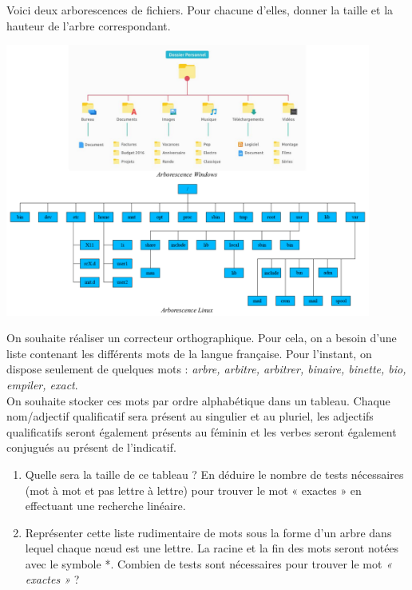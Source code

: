 \documentclass[a4paper,11pt]{article}
\begin{document}
\begin{exo}
    Voici deux arborescences de fichiers. Pour chacune d’elles, donner la taille et la hauteur de l’arbre correspondant.
    \begin{center}
        \centering
        \includegraphics[width=12cm]{ressources/os.png}
        \label{os}
    \end{center}
\end{exo}
\begin{exo}
    On souhaite réaliser un correcteur orthographique. Pour cela, on a besoin d’une liste contenant les différents mots
    de la langue française. Pour l’instant, on dispose seulement de quelques mots : \emph{arbre, arbitre, arbitrer, binaire, binette, bio, empiler, exact}.\\
    On souhaite stocker ces mots par ordre alphabétique dans un tableau. Chaque nom/adjectif qualificatif sera
    présent au singulier et au pluriel, les adjectifs qualificatifs seront également présents au féminin et les verbes seront également conjugués au présent de l’indicatif.
    \begin{enumerate}
        \item  Quelle sera la taille de ce tableau ? En déduire le nombre de tests nécessaires (mot à mot et pas lettre à lettre) pour trouver le mot « exactes » en effectuant une recherche linéaire.
        \item Représenter cette liste rudimentaire de mots sous la forme d’un arbre dans lequel chaque nœud est une lettre. La racine et la fin des mots seront notées avec le symbole *. Combien de tests sont nécessaires pour trouver le mot \emph{« exactes »} ?
    \end{enumerate}
\end{exo}
\end{document}
